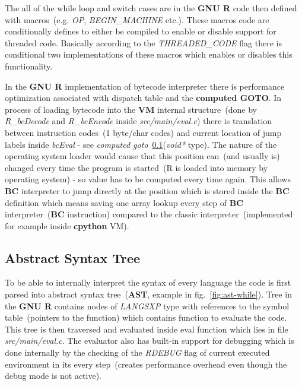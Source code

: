 \documentclass[thesis=M,english]{FITthesis}[2018/10/20]
\begin{document}
The all of the while loop and switch cases are in the \textbf{GNU R} code then defined with macros~(e.g. \textit{OP}, \textit{BEGIN{\_}MACHINE} etc.). These macros code are conditionally defines to either be compiled to enable or disable support for threaded code. Basically according to the \textit{THREADED{\_}CODE} flag there is conditional two implementations of these macros which enables or disables this functionality.

In the \textbf{GNU R} implementation of bytecode interpreter there is performance optimization associated with dispatch table and the \textbf{computed GOTO}. In process of loading bytecode into the \textbf{VM} internal structure~(done by \textit{R{\_}bcDecode} and \textit{R{\_}bcEncode} inside \textit{src/main/eval.c}) there is translation between instruction codes~(1 byte/char codes) and current location of jump labels inside \textit{bcEval} - see \textit{computed goto}~\ref{AST}(\textit{void*} type). The nature of the operating system loader would cause that this position can~(and usually is) changed every time the program is started~(R is loaded into memory by operating system) - so value has to be computed every time again. This allows \textbf{BC} interpreter to jump directly at the position which is stored inside the \textbf{BC} definition which means saving one array lookup every step of \textbf{BC} interpreter~(\textbf{BC} instruction) compared to the classic interpreter~(implemented for example inside \textbf{cpython} VM).

\subsection{Abstract Syntax Tree}\label{AST}

To be able to internally interpret the syntax of every language the code is first parsed into abstract syntax tree~(\textbf{AST}, example in fig.~\ref{fig:ast-while}). Tree in the \textbf{GNU R} contains nodes of \textit{LANGSXP} type with references to the symbol table~(pointers to the function) which contains function to evaluate the code. This tree is then traversed and evaluated inside eval function which lies in file \textit{src/main/eval.c}. The evaluator also has built-in support for debugging which is done internally by the checking of the \textit{RDEBUG} flag of current executed environment in its every step~(creates performance overhead even though the debug mode is not active).
\end{document}
